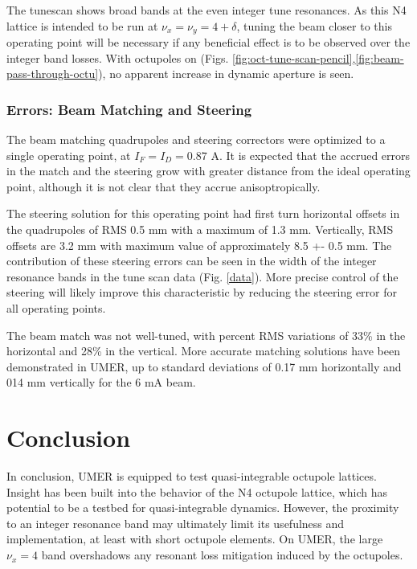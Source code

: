 The tunescan shows broad bands at the even integer tune resonances. As this N4 lattice is intended to be run at $\nu_x=\nu_y=4 + \delta$, tuning the beam closer to this operating point will be necessary if any beneficial effect is to be observed over the integer band losses. With octupoles on (Figs. \ref{fig:oct-tune-scan-pencil},\ref{fig:beam-pass-through-octu}), no apparent increase in dynamic aperture is seen. 



\subsubsection{Errors: Beam Matching and Steering}

The beam matching quadrupoles and steering correctors were optimized to a single operating point, at $I_F=I_D = 0.87$ A. It is expected that the accrued errors in the match and the steering grow with greater distance from the ideal operating point, although it is not clear that they accrue anisoptropically.

The steering solution for this operating point had first turn horizontal offsets in the quadrupoles  of RMS 0.5 mm with a maximum of 1.3 mm. Vertically, RMS offsets are 3.2 mm with maximum value of approximately 8.5 +- 0.5 mm. The contribution of these steering errors can be seen in the width of the integer resonance bands in the tune scan data (Fig. \ref{data}). More precise control of the steering will likely improve this characteristic by reducing the steering error for all operating points.

The beam match was not well-tuned, with percent RMS variations of 33\% in the horizontal and 28\% in the vertical. More accurate matching solutions have been demonstrated in UMER, up to standard deviations of 0.17 mm horizontally and 014 mm vertically for the 6 mA beam. \cite{HaoThesis}


\section{Conclusion}

In conclusion, UMER is equipped to test quasi-integrable octupole lattices. Insight has been built into the behavior of the N4 octupole lattice, which has potential to be a testbed for quasi-integrable dynamics. However, the proximity to an integer resonance band may ultimately limit its usefulness and implementation, at least with short octupole elements. On UMER, the large $\nu_x = 4$ band overshadows any resonant loss mitigation induced by the octupoles. 



